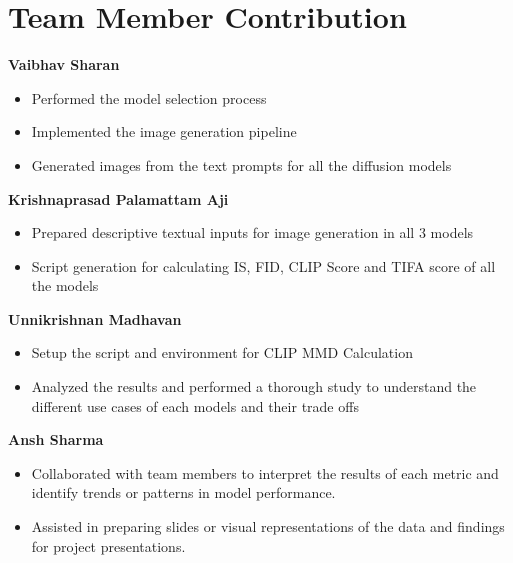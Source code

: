\documentclass{article}
\begin{document}

\section{Team Member Contribution}
\textbf{Vaibhav Sharan}
\begin{itemize}
    \item Performed the model selection process
    \item Implemented the image generation pipeline
    \item Generated images from the text prompts for all the diffusion models 
\end{itemize}
\textbf{Krishnaprasad Palamattam Aji}
\begin{itemize}
    \item Prepared descriptive textual inputs for image generation in all 3 models
    \item Script generation for calculating IS, FID, CLIP Score and TIFA score of all the models
\end{itemize}
\textbf{Unnikrishnan Madhavan}
\begin{itemize}
	\item Setup the script and environment for CLIP MMD Calculation
	\item Analyzed the results and performed a thorough study to understand the different use cases of each models and their trade offs
\end{itemize}
\textbf{Ansh Sharma}
\begin{itemize}
    \item Collaborated with team members to interpret the results of each metric and identify trends or patterns in model performance.    
    \item Assisted in preparing slides or visual representations of the data and findings for project presentations.
\end{itemize}
\end{document}
